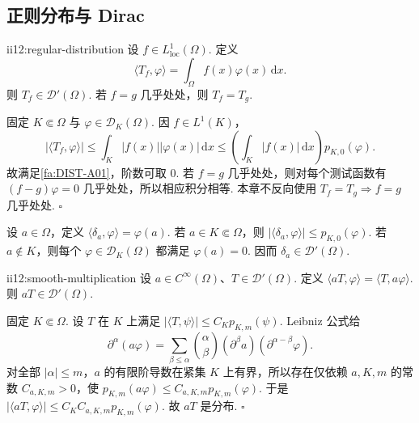 \subsection{正则分布与 Dirac}

\begin{FAProposition}[B][局部可积函数诱导正则分布]{ii12:regular-distribution}
设 \(\displaystyle f\in L^1_{\mathrm{loc}}(\Omega)\). 定义
\[
\langle T_f,\varphi\rangle
=
\int_\Omega f(x)\varphi(x)\,\mathrm{d}x.
\]
则 \(\displaystyle T_f\in\mathcal D'(\Omega)\). 若 \(\displaystyle f=g\) 几乎处处，则 \(\displaystyle T_f=T_g\).
\end{FAProposition}

\begin{FAProof}
固定 \(\displaystyle K\Subset\Omega\) 与 \(\displaystyle\varphi\in\mathcal D_K(\Omega)\). 因 \(\displaystyle f\in L^1(K)\)，
\[
|\langle T_f,\varphi\rangle|
\leqslant
\int_K|f(x)||\varphi(x)|\,\mathrm{d}x
\leqslant
\left(\int_K|f(x)|\,\mathrm{d}x\right)p_{K,0}(\varphi).
\]
故满足\autoref{fa:DIST-A01}，阶数可取 \(\displaystyle0\). 若 \(\displaystyle f=g\) 几乎处处，则对每个测试函数有 \(\displaystyle(f-g)\varphi=0\) 几乎处处，所以相应积分相等. 本章不反向使用 \(\displaystyle T_f=T_g\Rightarrow f=g\) 几乎处处.
\hfill\(\square\)
\end{FAProof}

\begin{FAExample}[Dirac 分布]
设 \(\displaystyle a\in\Omega\)，定义 \(\displaystyle \langle\delta_a,\varphi\rangle=\varphi(a).\)
若 \(\displaystyle a\in K\Subset\Omega\)，则 \(\displaystyle |\langle\delta_a,\varphi\rangle| \leqslant p_{K,0}(\varphi).\)
若 \(\displaystyle a\notin K\)，则每个 \(\displaystyle\varphi\in\mathcal D_K(\Omega)\) 都满足 \(\displaystyle\varphi(a)=0\). 因而 \(\displaystyle\delta_a\in\mathcal D'(\Omega)\).
\end{FAExample}

\begin{FAProposition}[B][光滑函数与分布的乘法]{ii12:smooth-multiplication}
设 \(\displaystyle a\in C^\infty(\Omega)\)、\(\displaystyle T\in\mathcal D'(\Omega)\). 定义 \(\displaystyle \langle aT,\varphi\rangle = \langle T,a\varphi\rangle.\)
则 \(\displaystyle aT\in\mathcal D'(\Omega)\).
\end{FAProposition}

\begin{FAProof}
固定 \(\displaystyle K\Subset\Omega\). 设 \(\displaystyle T\) 在 \(\displaystyle K\) 上满足 \(\displaystyle |\langle T,\psi\rangle| \leqslant C_Kp_{K,m}(\psi).\)
Leibniz 公式给
\[
\partial^\alpha(a\varphi)
=
\sum_{\beta\leqslant\alpha}
\binom{\alpha}{\beta}(\partial^\beta a)(\partial^{\alpha-\beta}\varphi).
\]
对全部 \(\displaystyle|\alpha|\leqslant m\)，\(\displaystyle a\) 的有限阶导数在紧集 \(\displaystyle K\) 上有界，所以存在仅依赖 \(\displaystyle a,K,m\) 的常数 \(\displaystyle C_{a,K,m}>0\)，使 \(\displaystyle p_{K,m}(a\varphi) \leqslant C_{a,K,m}p_{K,m}(\varphi).\)
于是 \(\displaystyle |\langle aT,\varphi\rangle| \leqslant C_KC_{a,K,m}p_{K,m}(\varphi).\)
故 \(\displaystyle aT\) 是分布.
\hfill\(\square\)
\end{FAProof}

